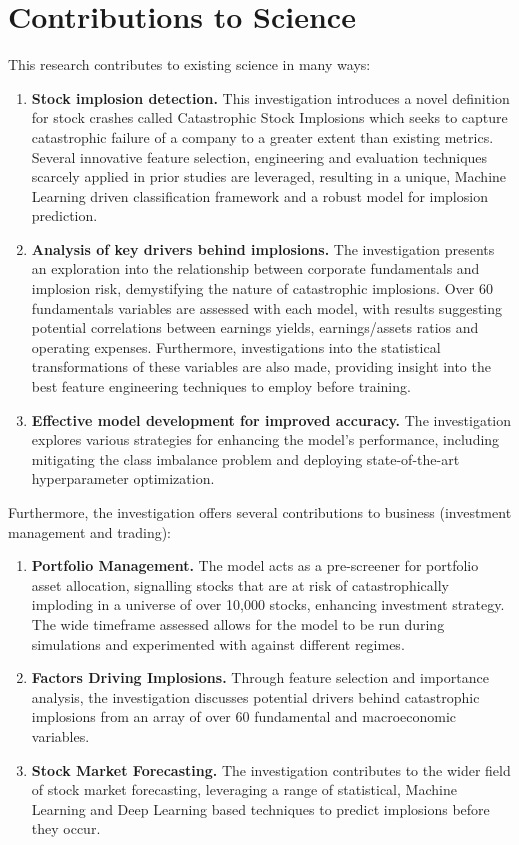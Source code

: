 \documentclass[a4paper]{report}
\begin{document}
\section{Contributions to Science}
This research contributes to existing science in many ways:
\begin{enumerate}
  \item { \bfseries Stock implosion detection.} This investigation introduces a novel definition for stock crashes called Catastrophic Stock Implosions which seeks to capture catastrophic failure of a company to a greater extent than existing metrics. Several innovative feature selection, engineering and evaluation techniques scarcely applied in prior studies are 
  leveraged, resulting in a unique, Machine Learning driven classification framework and a robust model for implosion prediction.
  \item { \bfseries Analysis of key drivers behind implosions.} The investigation presents an exploration into the relationship between corporate fundamentals and implosion risk, demystifying the nature of catastrophic implosions. Over 60 fundamentals variables 
  are assessed with each model, with results suggesting potential correlations between earnings yields, earnings/assets ratios and operating expenses. Furthermore, investigations into the statistical transformations of 
  these variables are also made, providing insight into the best feature engineering techniques to employ before training.
  \item { \bfseries Effective model development for improved accuracy.} The investigation explores various strategies for enhancing the model's performance, including mitigating the class imbalance problem 
  and deploying state-of-the-art hyperparameter optimization.
\end{enumerate}
Furthermore, the investigation offers several contributions to business (investment management and trading):
\begin{enumerate}
\item {\bfseries Portfolio Management.} The model acts as a pre-screener for portfolio asset allocation, signalling stocks that are at risk of catastrophically imploding in a 
universe of over 10,000 stocks, enhancing investment strategy. The wide timeframe assessed allows for the model to be run during simulations and experimented with against different regimes.
\item {\bfseries Factors Driving Implosions.} Through feature selection and importance analysis, the investigation discusses potential drivers behind catastrophic implosions from 
an array of over 60 fundamental and macroeconomic variables.
\item {\bfseries Stock Market Forecasting.} The investigation contributes to the wider field of stock market forecasting, leveraging a range of statistical, Machine Learning and 
Deep Learning based techniques to predict implosions before they occur.
\end{enumerate}
\end{document}
